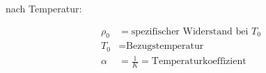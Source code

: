 nach Temperatur:

\vspace{-1mm}
\begin{minipage}{0.49\linewidth}
    \begin{footnotesize}
        \begin{center}
        \end{center}
    \end{footnotesize}
\end{minipage}
\begin{minipage}{0.5\linewidth}
    \begin{scriptsize}
        \begin{center}
            \begin{align*}
                \rho_0 &= \text{spezifischer Widerstand bei } T_0
                \\T_0 &= \text{Bezugstemperatur}
                \\\alpha &= \frac{1}{K} =\text{Temperaturkoeffizient}
            \end{align*}
        \end{center}
    \end{scriptsize}
\end{minipage}
\vspace{1mm}
